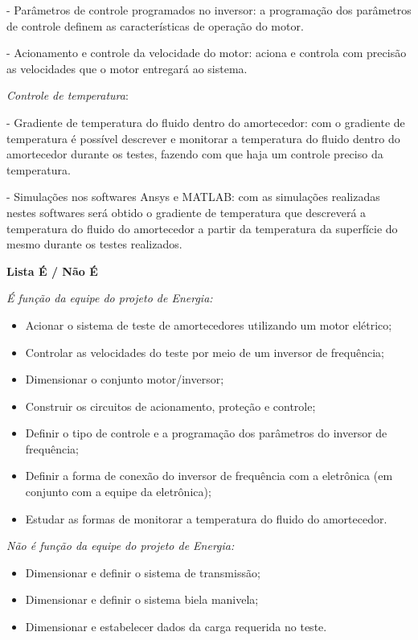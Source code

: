 	
	- Parâmetros de controle programados no inversor: a programação dos parâmetros de controle definem as características de operação do motor.
	
	- Acionamento e controle da velocidade do motor: aciona e controla com precisão as velocidades que o motor entregará ao sistema.

	\textit{Controle de temperatura}:

	
	- Gradiente de temperatura do fluido dentro do amortecedor: com o gradiente de temperatura é possível descrever e monitorar a temperatura do fluido dentro do amortecedor durante os testes, fazendo com que haja um controle preciso da temperatura.
	
	- Simulações nos softwares Ansys e MATLAB: com as simulações realizadas nestes softwares será obtido o gradiente de temperatura que descreverá a temperatura do fluido do amortecedor a partir da temperatura da superfície do mesmo durante os testes realizados.

	\textbf{Lista É / Não É}

	\textit{ É função da equipe do projeto de Energia:}

	\begin{itemize}
		\item Acionar o sistema de teste de amortecedores utilizando um motor elétrico;
		\item Controlar as velocidades do teste por meio de um inversor de frequência;
		\item Dimensionar o conjunto motor/inversor;
		\item Construir os circuitos de acionamento, proteção e controle;
		\item Definir o tipo de controle e a programação dos parâmetros do inversor de frequência;
		\item Definir a forma de conexão do inversor de frequência com a eletrônica (em conjunto com a equipe da eletrônica);
		\item Estudar as formas de monitorar a temperatura do fluido do amortecedor.
	\end{itemize}

	\textit{ Não é função da equipe do projeto de Energia:}

	\begin{itemize}
		\item Dimensionar e definir o sistema de transmissão;
		\item Dimensionar e definir o sistema biela manivela;
		\item Dimensionar e estabelecer dados da carga requerida no teste.

	\end{itemize}

